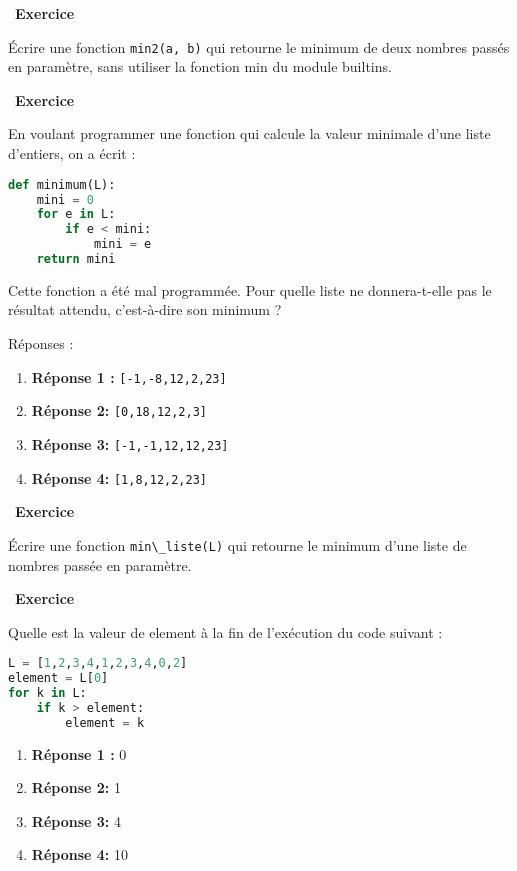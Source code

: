 \documentclass[
  11pt,
]{article}
\newcommand{\passthrough}[1]{#1}
\providecommand{\tightlist}{%
  \setlength{\itemsep}{0pt}\setlength{\parskip}{0pt}}
\newcounter{exo}
\newenvironment{exercice}[1]
{\par \medskip   \addtocounter{exo}{1} \noindent  
\begin{bclogo}[arrondi =0.1,   noborder = true, logo=\bccrayon, marge=4]{~\textbf{Exercice} \textbf{\theexo} {\itshape #1} }  \par}
{
\end{bclogo}
 \par \bigskip }
\newcounter{def}
\newcounter{prog}
\begin{document}
\begin{exercice}{}

Écrire une fonction \passthrough{\lstinline!min2(a, b)!} qui retourne le
minimum de deux nombres passés en paramètre, sans utiliser la fonction
min du module builtins.

\end{exercice}

\begin{exercice}{}

En voulant programmer une fonction qui calcule la valeur minimale d'une
liste d'entiers, on a écrit :

\begin{lstlisting}[language=Python]
def minimum(L):
    mini = 0
    for e in L:
        if e < mini:
            mini = e
    return mini
\end{lstlisting}

Cette fonction a été mal programmée. Pour quelle liste ne donnera-t-elle
pas le résultat attendu, c'est-à-dire son minimum ?

Réponses :

\begin{enumerate}
\def\labelenumi{\arabic{enumi}.}
\tightlist
\item
  \textbf{Réponse 1 :} \passthrough{\lstinline![-1,-8,12,2,23]!}
\item
  \textbf{Réponse 2:} \passthrough{\lstinline![0,18,12,2,3]!}
\item
  \textbf{Réponse 3:} \passthrough{\lstinline![-1,-1,12,12,23]!}
\item
  \textbf{Réponse 4:} \passthrough{\lstinline![1,8,12,2,23]!}
\end{enumerate}

\end{exercice}

\begin{exercice}{}

Écrire une fonction \passthrough{\lstinline!min\_liste(L)!} qui retourne
le minimum d'une liste de nombres passée en paramètre.

\end{exercice}

\begin{exercice}{}

Quelle est la valeur de element à la fin de l'exécution du code suivant
:

\begin{lstlisting}[language=Python]
L = [1,2,3,4,1,2,3,4,0,2]
element = L[0]
for k in L:
    if k > element:
        element = k
\end{lstlisting}

\begin{enumerate}
\def\labelenumi{\arabic{enumi}.}
\tightlist
\item
  \textbf{Réponse 1 :} 0
\item
  \textbf{Réponse 2:} 1
\item
  \textbf{Réponse 3:} 4
\item
  \textbf{Réponse 4:} 10
\end{enumerate}

\end{exercice}
\end{document}
